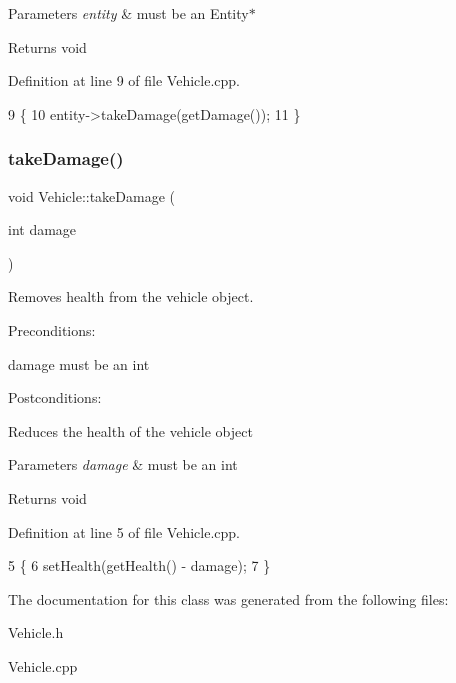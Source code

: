 \begin{DoxyParams}{Parameters}
{\em entity} & must be an Entity$\ast$ \\
\hline
\end{DoxyParams}
\begin{DoxyReturn}{Returns}
void 
\end{DoxyReturn}


Definition at line 9 of file Vehicle.\+cpp.


\begin{DoxyCode}
9                                        \{
10     entity->takeDamage(getDamage());
11 \}
\end{DoxyCode}
\mbox{\label{classVehicle_ae30a3d13e4d254993acf808a94fdff8d}} 
\subsubsection{\texorpdfstring{take\+Damage()}{takeDamage()}}
{\footnotesize\ttfamily void Vehicle\+::take\+Damage (\begin{DoxyParamCaption}\item[{int}]{damage }\end{DoxyParamCaption})}



Removes health from the vehicle object. 

Preconditions\+:
\begin{DoxyItemize}
\item damage must be an int
\end{DoxyItemize}

Postconditions\+:
\begin{DoxyItemize}
\item Reduces the health of the vehicle object
\end{DoxyItemize}


\begin{DoxyParams}{Parameters}
{\em damage} & must be an int \\
\hline
\end{DoxyParams}
\begin{DoxyReturn}{Returns}
void 
\end{DoxyReturn}


Definition at line 5 of file Vehicle.\+cpp.


\begin{DoxyCode}
5                                    \{
6     setHealth(getHealth() - damage);
7 \}
\end{DoxyCode}


The documentation for this class was generated from the following files\+:\begin{DoxyCompactItemize}
\item 
Vehicle.\+h\item 
Vehicle.\+cpp\end{DoxyCompactItemize}
